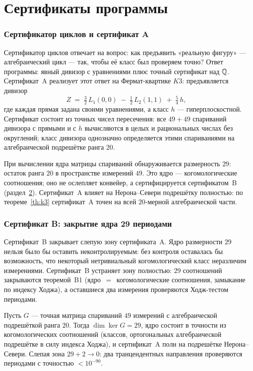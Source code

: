 \part{Сертификаты программы}

\section{Сертификатор циклов и сертификат A}\label{sec:certA}

Сертификатор циклов отвечает на вопрос: как предъявить «реальную
фигуру» — алгебраический цикл — так, чтобы её класс был проверяем
точно? Ответ программы: явный дивизор с уравнениями плюс точный
сертификат над $\mathbb{Q}$. Сертификат~A реализует этот ответ на
Фермат-квартике $K3$: предъявляется дивизор
\[
  Z \;=\; \tfrac32\,L_1(0,0)\;-\;\tfrac12\,L_2(1,1)\;+\;\tfrac54\,h,
\]
где каждая прямая задана своими уравнениями, а класс $h$ —
гиперплоскостной. Сертификат состоит из точных чисел пересечения:
все $49+49$ спариваний дивизора с прямыми и с $h$ вычисляются в
целых и рациональных числах без округлений; класс дивизора
однозначно определяется этими спариваниями на алгебраической
подрешётке ранга $20$.

При вычислении ядра матрицы спариваний обнаруживается размерность
$29$: остаток ранга $20$ в пространстве измерений $49$. Это ядро —
когомологические соотношения; оно не ослепляет конвейер, а
сертифицируется сертификатом~B (раздел~\ref{sec:certB}). Сертификат~A
влияет на Нерона--Севери подрешётку полностью: по теореме~\ref{th:k3}
сертификат~A точен на всей $20$-мерной алгебраической части.

\section{Сертификат B: закрытие ядра 29 периодами}\label{sec:certB}

Сертификат~B закрывает слепую зону сертификата~A. Ядро размерности
$29$ нельзя было бы оставить неконтролируемым: без контроля оставалась
бы возможность, что некоторый нетривиальный когомологический класс
неразличим измерениями. Сертификат~B устраняет зону полностью:
$29$ соотношений закрываются теоремой~B1 (ядро~$=$~когомологические
соотношения, замыкание по индексу Ходжа), а оставшиеся два измерения
проверяются Ходж-тестом периодами.

\begin{theorem}\label{th:B1}
Пусть $G$ — точная матрица спариваний $49$ измерений с алгебраической
подрешёткой ранга $20$. Тогда $\dim\ker G = 29$, ядро состоит в
точности из когомологических соотношений (классов, ортогональных
алгебраической подрешётке в силу индекса Ходжа), и сертификат~A
полн на подрешётке Нерона--Севери. Слепая зона
$29+2\to0$: два транцендентных направления проверяются
периодами с точностью $<10^{-90}$.
\end{theorem}

